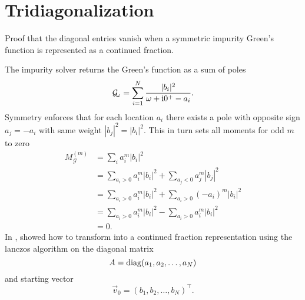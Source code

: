 
\chapter{Tridiagonalization}

Proof that the diagonal entries vanish when a symmetric impurity Green's function
is represented as a continued fraction.

The impurity solver returns the Green's function as a sum of poles
\begin{align}
    \mathcal{G}_{\!\omega} = \sum_{i=1}^N \frac{|b_i|^2}{\omega + \mathrm{i}0^+ - a_i}.
    \label{eq:impurity-greens-function}
\end{align}
Symmetry enforces that for each location $a_i$ there exists a pole with opposite sign
$a_j = -a_i$ with same weight $|b_j|^2 = |b_i|^2$.
This in turn sets all moments for odd $m$ to zero 
\begin{align}
    M^{(m)}_{\mathcal{G}}
     & =
    \sum_i a_i^m |b_i|^2                                       \\
     & =
    \sum_{a_i>0} a_i^m |b_i|^2 + \sum_{a_j<0} a_j^m |b_j|^2    \\
     & =
    \sum_{a_i>0} a_i^m |b_i|^2 + \sum_{a_i>0} (-a_i)^m |b_i|^2 \\
     & =
    \sum_{a_i>0} a_i^m |b_i|^2 - \sum_{a_i>0} a_i^m |b_i|^2    \\
     & =
    0.
\end{align}
In \cite[appendix B]{Lu2014}, \citeauthor{Lu2014} showed how to transform
 into a continued fraction representation
using the lanczos algorithm on the diagonal matrix
\begin{equation}
    A
    =
    \operatorname{diag}(a_1, a_2, \ldots, a_N)
\end{equation}
and starting vector
\begin{equation}
    \vec{v}_0 = (b_1, b_2, \ldots, b_N)^\intercal.
\end{equation}

